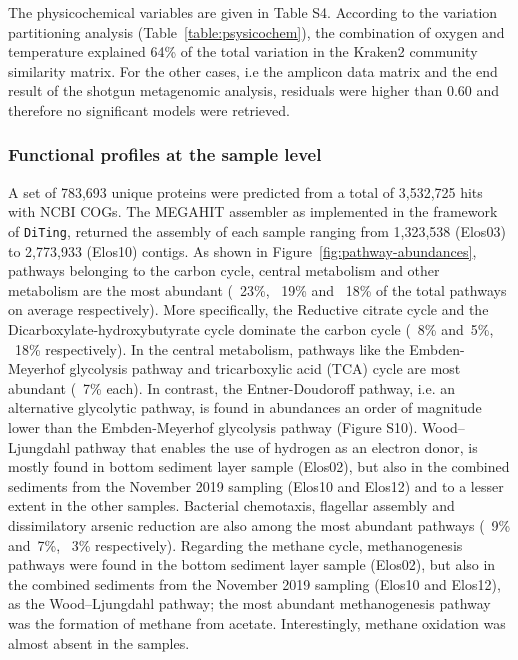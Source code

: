    The physicochemical variables are given in Table S4. 
   According to the variation partitioning analysis (Table~\ref{table:psysicochem}), the combination of oxygen and temperature explained 64\% of the total variation 
   in the Kraken2 community similarity matrix. 
   For the other cases, i.e the amplicon data matrix and the end result of the shotgun metagenomic analysis, residuals were higher than 0.60 and therefore no significant models were retrieved.


\subsubsection*{Functional profiles at the sample level}

   A set of 783,693 unique proteins were predicted from a total of 3,532,725 hits with NCBI COGs. 
   The MEGAHIT assembler as implemented in the framework of \texttt{DiTing}, returned the assembly of each sample 
   ranging from 1,323,538 (Elos03) to 2,773,933 (Elos10) contigs. 
   As shown in Figure~\ref{fig:pathway-abundances}, pathways belonging to the carbon cycle, central metabolism 
   and other metabolism are the most abundant (~23\%, ~19\% and ~18\% of the total pathways on average respectively). 
   More specifically, the Reductive citrate cycle and the Dicarboxylate-hydroxybutyrate cycle dominate the carbon cycle 
   (~8\% and~5\%, ~18\% respectively). 
   In the central metabolism, pathways like the Embden-Meyerhof glycolysis pathway and tricarboxylic acid (TCA) cycle 
   are most abundant (~7\% each). 
   In contrast, the Entner-Doudoroff pathway, i.e. an alternative glycolytic pathway, is found in abundances an order 
   of magnitude lower than the Embden-Meyerhof glycolysis pathway (Figure S10). 
   Wood–Ljungdahl pathway that enables the use of hydrogen as an electron donor, is mostly found in bottom sediment layer sample (Elos02), 
   but also in the combined sediments from the November 2019 sampling (Elos10 and Elos12) and to a lesser extent in the other samples. 
   Bacterial chemotaxis, flagellar assembly and dissimilatory arsenic reduction are also among the most abundant pathways (~9\% and~7\%, ~3\% respectively). 
   Regarding the methane cycle, methanogenesis pathways were found in the bottom sediment layer sample (Elos02), but also in the combined sediments 
   from the November 2019 sampling (Elos10 and Elos12), as the Wood–Ljungdahl pathway; 
   the most abundant methanogenesis pathway was the formation of methane from acetate. 
   Interestingly, methane oxidation was almost absent in the samples. 

